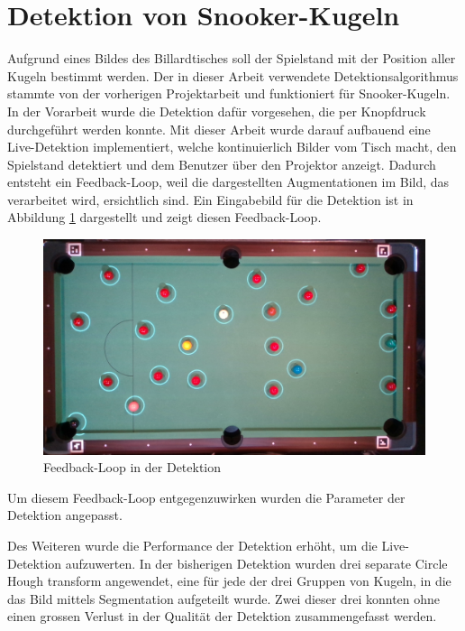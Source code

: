 \newpage
\section{Detektion von Snooker-Kugeln}\label{kap:detektion}
Aufgrund eines Bildes des Billardtisches soll der Spielstand mit der Position aller Kugeln bestimmt werden.
Der in dieser Arbeit verwendete Detektionsalgorithmus stammte von der vorherigen Projektarbeit\cite{project2:snooker_detection}
und funktioniert für Snooker-Kugeln.
In der Vorarbeit wurde die Detektion dafür vorgesehen, die per Knopfdruck durchgeführt werden konnte.
Mit dieser Arbeit wurde darauf aufbauend eine Live-Detektion implementiert, welche kontinuierlich Bilder vom Tisch macht,
den Spielstand detektiert und dem Benutzer über den Projektor anzeigt.
Dadurch entsteht ein Feedback-Loop, weil die dargestellten Augmentationen im Bild, das verarbeitet wird, ersichtlich sind.
Ein Eingabebild für die Detektion ist in Abbildung \ref{fig:detection_feedback_loop} dargestellt und zeigt diesen Feedback-Loop.

\begin{figure}[h!]
    \begin{center}
        \includegraphics[width=0.8\linewidth]{../common/03_billiard_ai/resources/detection_feedback_loop.png}
    \end{center}
    \caption{Feedback-Loop in der Detektion}
    \label{fig:detection_feedback_loop}
\end{figure}

Um diesem Feedback-Loop entgegenzuwirken wurden die Parameter der Detektion angepasst.

Des Weiteren wurde die Performance der Detektion erhöht, um die Live-Detektion aufzuwerten.
In der bisherigen Detektion wurden drei separate Circle Hough transform\cite{wiki:circle_hough} angewendet, eine für
jede der drei Gruppen von Kugeln, in die das Bild mittels Segmentation aufgeteilt wurde\cite{project2:snooker_detection}.
Zwei dieser drei konnten ohne einen grossen Verlust in der Qualität der Detektion zusammengefasst werden.

